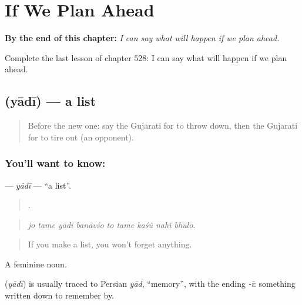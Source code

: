 
\chapter{If We Plan Ahead}
\label{ch:gu-if-we-plan-ahead}

\begin{chapteropening}
\textbf{By the end of this chapter:} \emph{I can say what will happen if we plan ahead.}

Complete the last lesson of chapter 528: I can say what will happen if we plan ahead.
\end{chapteropening}

\section[\texorpdfstring{\gu{યાદી} (yādī)}{યાદી (yādī)}]{ (yādī) — a list}

\label{lesson:GU-C528-yadi}



\begin{quote}
Before the new one: say the Gujarati for to throw down, then the Gujarati for to tire out (an opponent).
\end{quote}

\subsection*{You'll want to know: }
\textbf{} — \emph{yādī} — \textquotedblleft{}a list\textquotedblright{}.

\begin{quote}
        .
\end{quote}

\begin{quote}
\emph{jo tame yādī banāvśo to tame kaśũ nahī̃ bhūlo.}
\end{quote}

\begin{quote}
If you make a list, you won't forget anything.
\end{quote}

A feminine noun.

\begin{cousinweb}
\textbf{} (\emph{yādī}) is usually traced to Persian \emph{yād}, \textquotedblleft{}memory\textquotedblright{}, with the ending \emph{-ī}: something written down to remember by.
\end{cousinweb}

